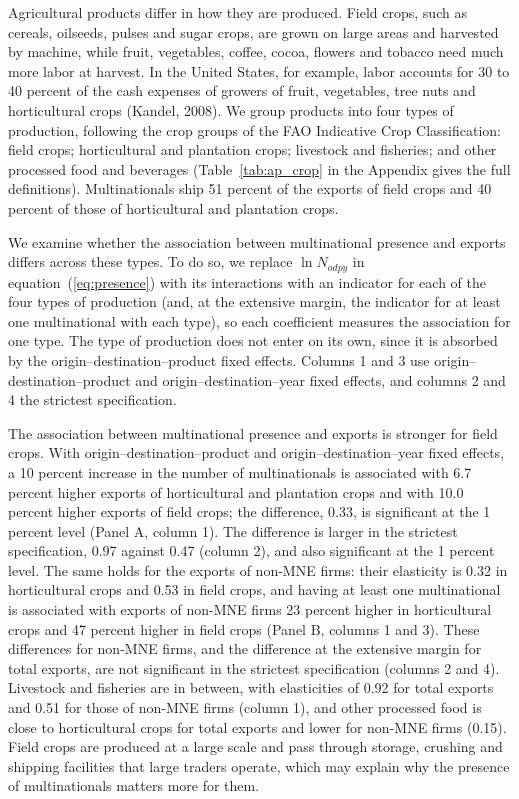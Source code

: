 \documentclass[11pt,a4paper]{article}
\begin{document}
Agricultural products differ in how they are produced. Field crops, such as cereals, oilseeds, pulses
and sugar crops, are grown on large areas and harvested by machine, while fruit, vegetables, coffee,
cocoa, flowers and tobacco need much more labor at harvest. In the United States, for example, labor
accounts for 30 to 40 percent of the cash expenses of growers of fruit, vegetables, tree nuts and
horticultural crops (Kandel, 2008). We group products into four types of production, following the
crop groups of the FAO Indicative Crop Classification: field crops; horticultural and plantation
crops; livestock and fisheries; and other processed food and beverages (Table~\ref{tab:ap_crop} in
the Appendix gives the full definitions). Multinationals ship 51 percent of the exports of field
crops and 40 percent of those of horticultural and plantation crops.

We examine whether the association between multinational presence and exports differs across these
types. To do so, we replace $\ln N_{odpy}$ in equation~(\ref{eq:presence}) with its interactions with
an indicator for each of the four types of production (and, at the extensive margin, the indicator for
at least one multinational with each type), so each coefficient measures the association for one
type. The type of production does not enter on its own, since it is absorbed by the
origin--destination--product fixed effects. Columns 1 and 3 use origin--destination--product and
origin--destination--year fixed effects, and columns 2 and 4 the strictest specification.

The association between multinational presence and exports is stronger for field crops. With
origin--destination--product and origin--destination--year fixed effects, a 10 percent increase in
the number of multinationals is associated with 6.7 percent higher exports of horticultural and
plantation crops and with 10.0 percent higher exports of field crops; the difference, 0.33, is
significant at the 1 percent level (Panel A, column 1). The difference is larger in the strictest
specification, 0.97 against 0.47 (column 2), and also significant at the 1 percent level. The same holds for the exports of non-MNE
firms: their elasticity is 0.32 in horticultural crops and 0.53 in field crops, and having at least
one multinational is associated with exports of non-MNE firms 23 percent higher in horticultural
crops and 47 percent higher in field crops (Panel B, columns 1 and 3). These differences for non-MNE
firms, and the difference at the extensive margin for total exports, are not significant in the
strictest specification (columns 2 and 4). Livestock and fisheries are in between, with elasticities of 0.92 for total
exports and 0.51 for those of non-MNE firms (column 1), and other processed food is close to
horticultural crops for total exports and lower for non-MNE firms (0.15). Field crops are
produced at a large scale and pass through storage, crushing and shipping facilities that large
traders operate, which may explain why the presence of multinationals matters more for them.
\end{document}
